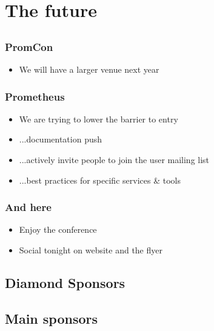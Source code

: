 \documentclass[t]{beamer}
\begin{document}

\section{The future}
\subsection{}

\begin{frame}
	\frametitle{PromCon}
	\vfill
	\begin{itemize}
		\item We will have a larger venue next year
	\end{itemize}
	\vfill
\end{frame}

\begin{frame}
	\frametitle{Prometheus}
	\vfill
	\begin{itemize}
		\item We are trying to lower the barrier to entry
		\item ...documentation push
		\item ...actively invite people to join the user mailing list
		\item ...best practices for specific services \& tools
	\end{itemize}
	\vfill
\end{frame}

\begin{frame}
	\frametitle{And here}
	\vfill
	\begin{itemize}
		\item Enjoy the conference
		\item Social tonight on website and the flyer
	\end{itemize}
	\vfill
\end{frame}



\subsection{Diamond Sponsors}



\subsection{Main sponsors}
\end{document}
